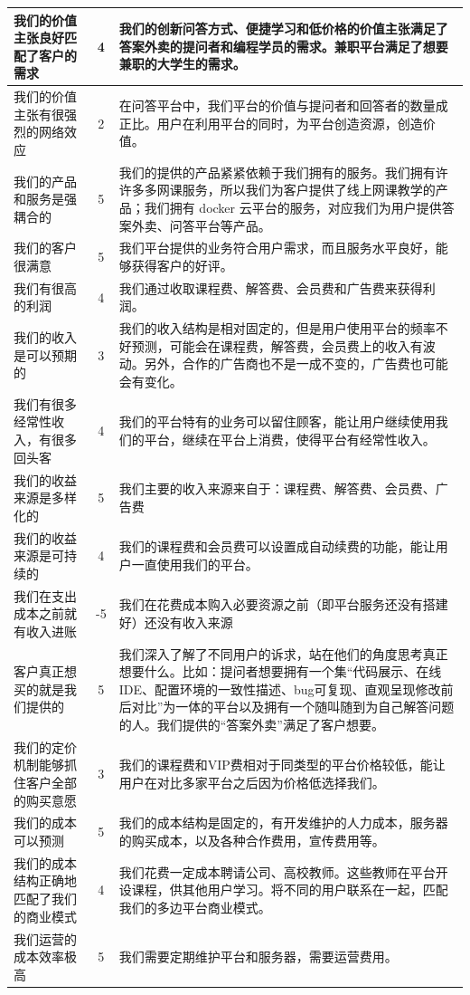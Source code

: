 \documentclass[a4paper]{ctexart}
\begin{document}
\begin{table}[h]
  \centering
\begin{tabular}{|p{3.5cm}|c|p{10cm}|}
  \hline
  我们的价值主张良好匹配了客户的需求 & 4 & 我们的创新问答方式、便捷学习和低价格的价值主张满足了答案外卖的提问者和编程学员的需求。兼职平台满足了想要兼职的大学生的需求。\\
  \hline
  我们的价值主张有很强烈的网络效应  & 2 & 在问答平台中，我们平台的价值与提问者和回答者的数量成正比。用户在利用平台的同时，为平台创造资源，创造价值。\\
  \hline
  我们的产品和服务是强耦合的 & 5 & 我们的提供的产品紧紧依赖于我们拥有的服务。我们拥有许许多多网课服务，所以我们为客户提供了线上网课教学的产品；我们拥有 docker 云平台的服务，对应我们为用户提供答案外卖、问答平台等产品。\\
  \hline
  我们的客户很满意 & 5 & 我们平台提供的业务符合用户需求，而且服务水平良好，能够获得客户的好评。\\
  \hline
  我们有很高的利润 & 4 & 我们通过收取课程费、解答费、会员费和广告费来获得利润。\\
  \hline
  我们的收入是可以预期的 & 3 & 我们的收入结构是相对固定的，但是用户使用平台的频率不好预测，可能会在课程费，解答费，会员费上的收入有波动。另外，合作的广告商也不是一成不变的，广告费也可能会有变化。\\
  \hline
  我们有很多经常性收入，有很多回头客 & 4 & 我们的平台特有的业务可以留住顾客，能让用户继续使用我们的平台，继续在平台上消费，使得平台有经常性收入。\\
  \hline
  我们的收益来源是多样化的 & 5 & 我们主要的收入来源来自于：课程费、解答费、会员费、广告费\\
  \hline
  我们的收益来源是可持续的 & 4 & 我们的课程费和会员费可以设置成自动续费的功能，能让用户一直使用我们的平台。\\
  \hline
  我们在支出成本之前就有收入进账 & -5 & 我们在花费成本购入必要资源之前（即平台服务还没有搭建好）还没有收入来源\\
  \hline
  客户真正想买的就是我们提供的 & 5 & 我们深入了解了不同用户的诉求，站在他们的角度思考真正想要什么。比如：提问者想要拥有一个集“代码展示、在线IDE、配置环境的一致性描述、bug可复现、直观呈现修改前后对比”为一体的平台以及拥有一个随叫随到为自己解答问题的人。我们提供的“答案外卖”满足了客户想要。\\
  \hline
  我们的定价机制能够抓住客户全部的购买意愿 & 3 & 我们的课程费和VIP费相对于同类型的平台价格较低，能让用户在对比多家平台之后因为价格低选择我们。\\
  \hline
  我们的成本可以预测 & 5 & 我们的成本结构是固定的，有开发维护的人力成本，服务器的购买成本，以及各种合作费用，宣传费用等。\\
  \hline
  我们的成本结构正确地匹配了我们的商业模式 & 4 & 我们花费一定成本聘请公司、高校教师。这些教师在平台开设课程，供其他用户学习。将不同的用户联系在一起，匹配我们的多边平台商业模式。\\
  \hline
  我们运营的成本效率极高 & 5 & 我们需要定期维护平台和服务器，需要运营费用。\\
  \hline
\end{tabular}
\end{table}
\end{document}
